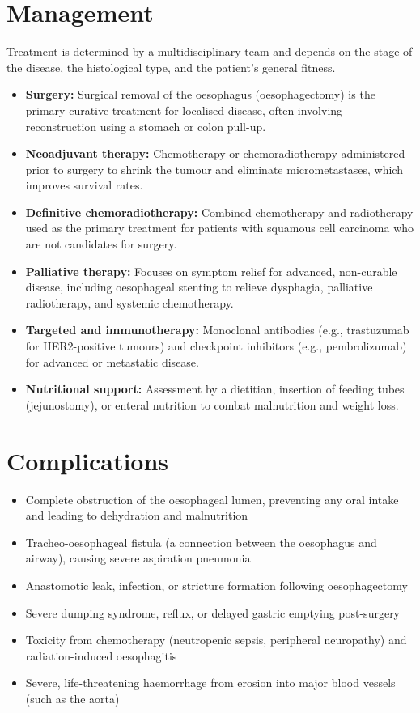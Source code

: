 \section*{Management}
Treatment is determined by a multidisciplinary team and depends on the stage of the disease, the histological type, and the patient's general fitness.
\begin{itemize}
    \item \textbf{Surgery:} Surgical removal of the oesophagus (oesophagectomy) is the primary curative treatment for localised disease, often involving reconstruction using a stomach or colon pull-up.
    \item \textbf{Neoadjuvant therapy:} Chemotherapy or chemoradiotherapy administered prior to surgery to shrink the tumour and eliminate micrometastases, which improves survival rates.
    \item \textbf{Definitive chemoradiotherapy:} Combined chemotherapy and radiotherapy used as the primary treatment for patients with squamous cell carcinoma who are not candidates for surgery.
    \item \textbf{Palliative therapy:} Focuses on symptom relief for advanced, non-curable disease, including oesophageal stenting to relieve dysphagia, palliative radiotherapy, and systemic chemotherapy.
    \item \textbf{Targeted and immunotherapy:} Monoclonal antibodies (e.g., trastuzumab for HER2-positive tumours) and checkpoint inhibitors (e.g., pembrolizumab) for advanced or metastatic disease.
    \item \textbf{Nutritional support:} Assessment by a dietitian, insertion of feeding tubes (jejunostomy), or enteral nutrition to combat malnutrition and weight loss.
\end{itemize}

\section*{Complications}
\begin{itemize}
    \item Complete obstruction of the oesophageal lumen, preventing any oral intake and leading to dehydration and malnutrition
    \item Tracheo-oesophageal fistula (a connection between the oesophagus and airway), causing severe aspiration pneumonia
    \item Anastomotic leak, infection, or stricture formation following oesophagectomy
    \item Severe dumping syndrome, reflux, or delayed gastric emptying post-surgery
    \item Toxicity from chemotherapy (neutropenic sepsis, peripheral neuropathy) and radiation-induced oesophagitis
    \item Severe, life-threatening haemorrhage from erosion into major blood vessels (such as the aorta)
\end{itemize}

